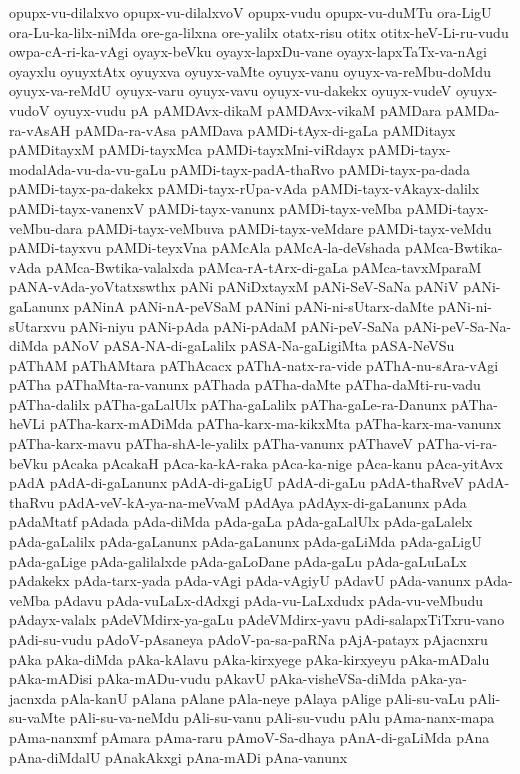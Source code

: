 {opupx-vu-dilalxvo
opupx-vu-dilalxvoV
opupx-vudu
opupx-vu-duMTu
ora-LigU
ora-Lu-ka-lilx-niMda
ore-ga-lilxna
ore-yalilx
otatx-risu
otitx
otitx-heV-Li-ru-vudu
owpa-cA-ri-ka-vAgi
oyayx-beVku
oyayx-lapxDu-vane
oyayx-lapxTaTx-va-nAgi
oyayxlu
oyuyxtAtx
oyuyxva
oyuyx-vaMte
oyuyx-vanu
oyuyx-va-reMbu-doMdu
oyuyx-va-reMdU
oyuyx-varu
oyuyx-vavu
oyuyx-vu-dakekx
oyuyx-vudeV
oyuyx-vudoV
oyuyx-vudu
pA
pAMDAvx-dikaM
pAMDAvx-vikaM
pAMDara
pAMDa-ra-vAsAH
pAMDa-ra-vAsa
pAMDava
pAMDi-tAyx-di-gaLa
pAMDitayx
pAMDitayxM
pAMDi-tayxMca
pAMDi-tayxMni-viRdayx
pAMDi-tayx-modalAda-vu-da-vu-gaLu
pAMDi-tayx-padA-thaRvo
pAMDi-tayx-pa-dada
pAMDi-tayx-pa-dakekx
pAMDi-tayx-rUpa-vAda
pAMDi-tayx-vAkayx-dalilx
pAMDi-tayx-vanenxV
pAMDi-tayx-vanunx
pAMDi-tayx-veMba
pAMDi-tayx-veMbu-dara
pAMDi-tayx-veMbuva
pAMDi-tayx-veMdare
pAMDi-tayx-veMdu
pAMDi-tayxvu
pAMDi-teyxVna
pAMcAla
pAMcA-la-deVshada
pAMca-Bwtika-vAda
pAMca-Bwtika-valalxda
pAMca-rA-tArx-di-gaLa
pAMca-tavxMparaM
pANA-vAda-yoVtatxswthx
pANi
pANiDxtayxM
pANi-SeV-SaNa
pANiV
pANi-gaLanunx
pANinA
pANi-nA-peVSaM
pANini
pANi-ni-sUtarx-daMte
pANi-ni-sUtarxvu
pANi-niyu
pANi-pAda
pANi-pAdaM
pANi-peV-SaNa
pANi-peV-Sa-Na-diMda
pANoV
pASA-NA-di-gaLalilx
pASA-Na-gaLigiMta
pASA-NeVSu
pAThAM
pAThAMtara
pAThAcacx
pAThA-natx-ra-vide
pAThA-nu-sAra-vAgi
pATha
pAThaMta-ra-vanunx
pAThada
pATha-daMte
pATha-daMti-ru-vadu
pATha-dalilx
pATha-gaLalUlx
pATha-gaLalilx
pATha-gaLe-ra-Danunx
pATha-heVLi
pATha-karx-mADiMda
pATha-karx-ma-kikxMta
pATha-karx-ma-vanunx
pATha-karx-mavu
pATha-shA-le-yalilx
pATha-vanunx
pAThaveV
pATha-vi-ra-beVku
pAcaka
pAcakaH
pAca-ka-kA-raka
pAca-ka-nige
pAca-kanu
pAca-yitAvx
pAdA
pAdA-di-gaLanunx
pAdA-di-gaLigU
pAdA-di-gaLu
pAdA-thaRveV
pAdA-thaRvu
pAdA-veV-kA-ya-na-meVvaM
pAdAya
pAdAyx-di-gaLanunx
pAda
pAdaMtatf
pAdada
pAda-diMda
pAda-gaLa
pAda-gaLalUlx
pAda-gaLalelx
pAda-gaLalilx
pAda-gaLanunx
pAda-gaLanunx
pAda-gaLiMda
pAda-gaLigU
pAda-gaLige
pAda-galilalxde
pAda-gaLoDane
pAda-gaLu
pAda-gaLuLaLx
pAdakekx
pAda-tarx-yada
pAda-vAgi
pAda-vAgiyU
pAdavU
pAda-vanunx
pAda-veMba
pAdavu
pAda-vuLaLx-dAdxgi
pAda-vu-LaLxdudx
pAda-vu-veMbudu
pAdayx-valalx
pAdeVMdirx-ya-gaLu
pAdeVMdirx-yavu
pAdi-salapxTiTxru-vano
pAdi-su-vudu
pAdoV-pAsaneya
pAdoV-pa-sa-paRNa
pAjA-patayx
pAjacnxru
pAka
pAka-diMda
pAka-kAlavu
pAka-kirxyege
pAka-kirxyeyu
pAka-mADalu
pAka-mADisi
pAka-mADu-vudu
pAkavU
pAka-visheVSa-diMda
pAka-ya-jacnxda
pAla-kanU
pAlana
pAlane
pAla-neye
pAlaya
pAlige
pAli-su-vaLu
pAli-su-vaMte
pAli-su-va-neMdu
pAli-su-vanu
pAli-su-vudu
pAlu
pAma-nanx-mapa
pAma-nanxmf
pAmara
pAma-raru
pAmoV-Sa-dhaya
pAnA-di-gaLiMda
pAna
pAna-diMdalU
pAnakAkxgi
pAna-mADi
pAna-vanunx
}
